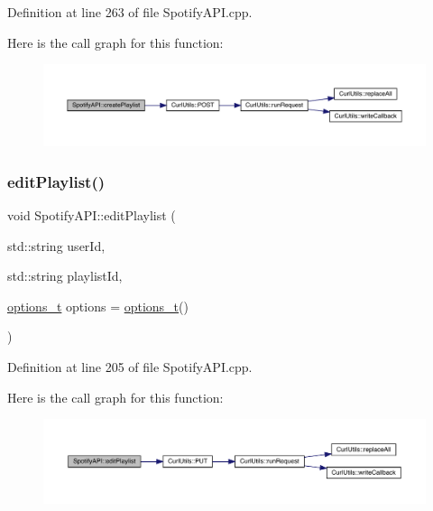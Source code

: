 Definition at line 263 of file Spotify\+A\+P\+I.\+cpp.

Here is the call graph for this function\+:
\nopagebreak
\begin{figure}[H]
\begin{center}
\leavevmode
\includegraphics[width=350pt]{class_spotify_a_p_i_a1ac0dc243fd741bc5141b5cb275d5ff1_cgraph}
\end{center}
\end{figure}
\mbox{\label{class_spotify_a_p_i_ae9364eeba6428a021dd34dd3976acc99}} 
\subsubsection{\texorpdfstring{edit\+Playlist()}{editPlaylist()}}
{\footnotesize\ttfamily void Spotify\+A\+P\+I\+::edit\+Playlist (\begin{DoxyParamCaption}\item[{std\+::string}]{user\+Id,  }\item[{std\+::string}]{playlist\+Id,  }\item[{\mbox{\hyperlink{_spotify_a_p_i_8h_a0ff5cac1a4007bb330b7d9939650c283}{options\+\_\+t}}}]{options = {\ttfamily \mbox{\hyperlink{_spotify_a_p_i_8h_a0ff5cac1a4007bb330b7d9939650c283}{options\+\_\+t}}()} }\end{DoxyParamCaption})}



Definition at line 205 of file Spotify\+A\+P\+I.\+cpp.

Here is the call graph for this function\+:
\nopagebreak
\begin{figure}[H]
\begin{center}
\leavevmode
\includegraphics[width=350pt]{class_spotify_a_p_i_ae9364eeba6428a021dd34dd3976acc99_cgraph}
\end{center}
\end{figure}
\mbox{\label{class_spotify_a_p_i_aea55f7caebed1664d2c39d1c3c4612ec}} 
